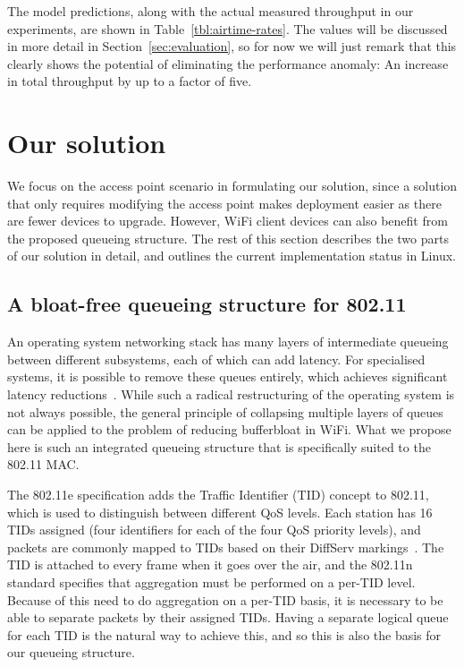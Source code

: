 \documentclass[english]{scrartcl}
\begin{document}
The model predictions, along with the actual measured throughput in our
experiments, are shown in Table \ref{tbl:airtime-rates}. The values will be
discussed in more detail in Section \ref{sec:evaluation}, so for now we will
just remark that this clearly shows the potential of eliminating the performance
anomaly: An increase in total throughput by up to a factor of five.


\section{Our solution}
\label{sec:solution}
We focus on the access point scenario in formulating our solution, since a
solution that only requires modifying the access point makes deployment easier
as there are fewer devices to upgrade. However, WiFi client devices can also
benefit from the proposed queueing structure. The rest of this section describes
the two parts of our solution in detail, and outlines the current implementation
status in Linux.

\addtocounter{footnote}{1}

\subsection{A bloat-free queueing structure for 802.11}
\label{sec:org455e1f5}
An operating system networking stack has many layers of intermediate queueing
between different subsystems, each of which can add latency. For specialised
systems, it is possible to remove these queues entirely, which achieves
significant latency reductions \cite{adam_belay_ix:_2014}. While such a radical
restructuring of the operating system is not always possible, the general
principle of collapsing multiple layers of queues can be applied to the problem
of reducing bufferbloat in WiFi. What we propose here is such an integrated
queueing structure that is specifically suited to the 802.11 MAC.

The 802.11e specification adds the Traffic Identifier (TID) concept to 802.11,
which is used to distinguish between different QoS levels. Each station has 16
TIDs assigned (four identifiers for each of the four QoS priority levels), and
packets are commonly mapped to TIDs based on their DiffServ
markings \cite{ietf-802-11}. The TID is attached to every frame when it goes
over the air, and the 802.11n standard specifies that aggregation must be
performed on a per-TID level. Because of this need to do aggregation on a
per-TID basis, it is necessary to be able to separate packets by their assigned
TIDs. Having a separate logical queue for each TID is the natural way to achieve
this, and so this is also the basis for our queueing structure.
\end{document}
